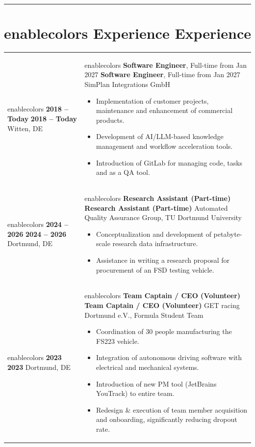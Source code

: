 \documentclass[a4paper,11pt]{article}
\newcommand{\col}[2]{
    \ifcsname enablecolors\endcsname
        \textcolor[HTML]{#1}{#2}
    \else
        #2
    \fi
}
\begin{document}
\vspace{0.25cm}
\hrule

\section*{\col{b1784a}{Experience}}
\setlength{\tabcolsep}{0pt}
\begin{tabularx}{\textwidth}{@{}p{}X@{}}
    \col{ae7c58}{\textbf{2018 -- Today}}\newline
    Witten, DE &

    \col{ae7c58}{\textbf{Software Engineer}, {\small Full-time from Jan 2027}}\newline
    SimPlan Integrations GmbH
    \begin{itemize}
        \small
        \item Implementation of customer projects, maintenance and enhancement of commercial products.
        \item Development of AI/LLM-based knowledge management and workflow acceleration tools.
        \item Introduction of GitLab for managing code, tasks and as a QA tool.
    \end{itemize}
    \\[0.125cm]


    \col{b57e53}{\textbf{2024 -- 2026}}\newline
    Dortmund, DE &

    \col{b57e53}{\textbf{Research Assistant (Part-time)}}\newline
    Automated Quality Assurance Group, TU Dortmund University
    \begin{itemize}
        \small
        \item Conceptualization and development of petabyte-scale research data infrastructure.
        \item Assistance in writing a research proposal for procurement of an FSD testing vehicle.
    \end{itemize}
    \\[0.125cm]


    \col{ab8064}{\textbf{2023}}\newline
    Dortmund, DE &

    \col{ab8064}{\textbf{Team Captain / CEO (Volunteer)}}\newline
    GET racing Dortmund e.V., Formula Student Team
    \begin{itemize}
        \small
        \item Coordination of 30 people manufacturing the FS223 vehicle.
        \item Integration of autonomous driving software with electrical and mechanical systems.
        \item Introduction of new PM tool (JetBrains YouTrack) to entire team.
        \item Redesign \& execution of team member acquisition and onboarding, significantly redu\-cing dropout rate.
    \end{itemize}
    \\[0.125cm]



\end{tabularx}
\end{document}
